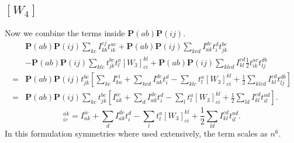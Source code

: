 \documentclass[graybox,sectrefs,envcountresetchap,open=right]{svmonodo}
\begin{document}
\subsection{$[W_4]$}
Now we combine the terms inside $\mathbf{P}(ab) \mathbf{P}(ij)$. 
\begin{align}
& \mathbf{P}(ab) \mathbf{P}(ij) \sum_{kc} I_{kb}^{cj} t_{ik}^{ac}
+ \mathbf{P}(ab) \mathbf{P}(ij) \sum_{kcd} I_{ak}^{dc} t_i^d t_{jk}^{bc}
\nonumber \\ &
- \mathbf{P}(ab) \mathbf{P}(ij) \sum_{klc} t_{jk}^{bc} t_l^a [W_3]_{ci}^{kl}
+ \mathbf{P}(ab) \mathbf{P}(ij) \sum_{klcd} I_{kl}^{cd} \frac{1}{2} t_{ik}^{ac} t_{lj}^{db}
\nonumber \\
= & \mathbf{P}(ab) \mathbf{P}(ij) t^{bc}_{jk} \left[
\sum_{kc} I_{ka}^{ci} 
+ \sum_{kcd} I_{ak}^{dc} t_i^d
- \sum_{klc} t_l^a [W_3]_{ci}^{kl}
+ \frac{1}{2} \sum_{klcd} I_{kl}^{cd} t_{lj}^{db}
\right] \nonumber \\ 
= &
\mathbf{P}(ab) \mathbf{P}(ij)  \sum_{kc} t^{bc}_{jk} \left[
I_{ak}^{ic} 
+ \sum_{d} I_{ak}^{dc} t_i^d
- \sum_{l} t_l^a [W_3]_{ci}^{kl}
+ \frac{1}{2} \sum_{ld} I_{kl}^{cd} t_{il}^{ad}
\right] .
\end{align}
\begin{equation}
[W_4]_{ic}^{ak} = 
I_{ak}^{ic} 
+ \sum_{d} I_{ak}^{dc} t_i^d
- \sum_{l} t_l^a [W_3]_{ci}^{kl}
+ \frac{1}{2} \sum_{ld} I_{kl}^{cd} t_{il}^{ad} .
\label{intermedW4}
\end{equation}
In this formulation symmetries where used extensively, the term scales as $n^6$.
\end{document}
